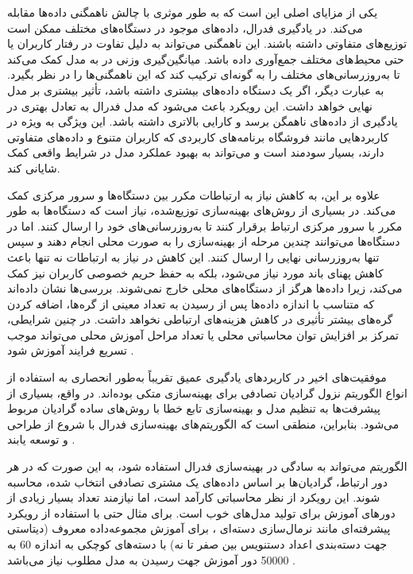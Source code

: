 یکی از مزایای اصلی
این است که به طور موثری با چالش ناهمگنی داده‌ها مقابله می‌کند. در یادگیری فدرال، داده‌های موجود در دستگاه‌های مختلف ممکن است توزیع‌های متفاوتی داشته باشند. این ناهمگنی می‌تواند به دلیل تفاوت در رفتار کاربران یا حتی محیط‌های مختلف جمع‌آوری داده باشد. میانگین‌گیری وزنی در
به مدل کمک می‌کند تا به‌روزرسانی‌های مختلف را به گونه‌ای ترکیب کند که این ناهمگنی‌ها را در نظر بگیرد. به عبارت دیگر، اگر یک دستگاه داده‌های بیشتری داشته باشد، تأثیر بیشتری بر مدل نهایی خواهد داشت. این رویکرد باعث می‌شود که مدل فدرال به تعادل بهتری در یادگیری از داده‌های ناهمگن برسد و کارایی بالاتری داشته باشد. این ویژگی به ویژه در کاربردهایی مانند فروشگاه برنامه‌های کاربردی که کاربران متنوع و داده‌های متفاوتی دارند، بسیار سودمند است و می‌تواند به بهبود عملکرد مدل در شرایط واقعی کمک شایانی کند.

علاوه بر این،
به کاهش نیاز به ارتباطات مکرر بین دستگاه‌ها و سرور مرکزی کمک می‌کند. در بسیاری از روش‌های بهینه‌سازی توزیع‌شده، نیاز است که دستگاه‌ها به طور مکرر با سرور مرکزی ارتباط برقرار کنند تا به‌روزرسانی‌های خود را ارسال کنند. اما در
دستگاه‌ها می‌توانند چندین مرحله از بهینه‌سازی را به صورت محلی انجام دهند و سپس تنها به‌روزرسانی نهایی را ارسال کنند. این کاهش در نیاز به ارتباطات نه تنها باعث کاهش پهنای باند مورد نیاز می‌شود، بلکه به حفظ حریم خصوصی کاربران نیز کمک می‌کند، زیرا داده‌ها هرگز از دستگاه‌های محلی خارج نمی‌شوند. بررسی‌ها نشان داده‌اند که متناسب با اندازه داده‌ها پس از رسیدن به تعداد معینی از گره‌ها، اضافه کردن گره‌های بیشتر تأثیری در کاهش هزینه‌های ارتباطی نخواهد داشت. در چنین شرایطی، تمرکز بر افزایش توان محاسباتی محلی یا تعداد مراحل آموزش محلی می‌تواند موجب تسریع فرایند آموزش شود
\cite{mcmahan2017communication}.

موفقیت‌های اخیر در کاربردهای یادگیری عمیق تقریباً به‌طور انحصاری به استفاده از انواع الگوریتم نزول گرادیان تصادفی%
برای بهینه‌سازی متکی بوده‌اند. در واقع، بسیاری از پیشرفت‌ها به تنظیم مدل و بهینه‌سازی تابع خطا با روش‌های ساده گرادیان مربوط می‌شود. بنابراین، منطقی است که الگوریتم‌های بهینه‌سازی فدرال با شروع از
طراحی و توسعه یابند
\cite{mcmahan2017communication}.

الگوریتم
می‌تواند به سادگی در بهینه‌سازی فدرال استفاده شود، به این صورت که در هر دور ارتباط، گرادیان‌ها بر اساس داده‌های یک مشتری تصادفی انتخاب شده، محاسبه ‌شوند. این رویکرد از نظر محاسباتی کارآمد است، اما نیازمند تعداد بسیار زیادی از دورهای آموزش برای تولید مدل‌های خوب است.
برای مثال حتی با استفاده از رویکرد پیشرفته‌ای مانند نرمال‌سازی دسته‌ای%
%
، برای آموزش مجموعه‌داده معروف
(دیتاستی جهت دسته‌بندی اعداد دستنویس بین صفر تا نه)
با دسته‌های کوچکی به اندازه 60 به 50000 دور آموزش جهت رسیدن به مدل مطلوب نیاز می‌باشد
\cite{ioffe2015batch}.

